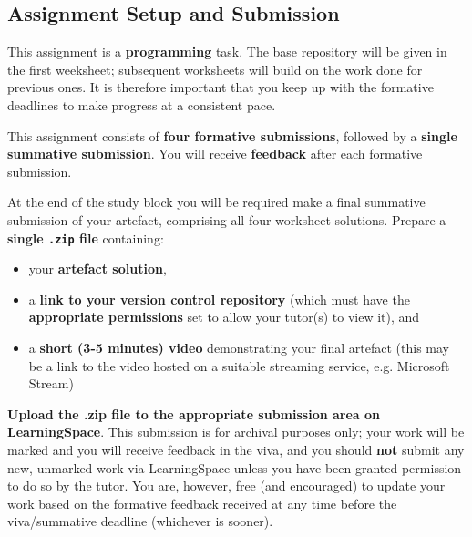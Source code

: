 \documentclass{../../fal_assignment}
\begin{document}
\subsection*{Assignment Setup and Submission}

This assignment is a \textbf{programming} task. The base repository will be given in the first weeksheet; subsequent worksheets will build on the work done for previous ones.
It is therefore important that you keep up with the formative deadlines to make progress at a consistent pace.

This assignment consists of \textbf{four formative submissions}, followed by a \textbf{single summative submission}.
You will receive \textbf{feedback} after each formative submission.

At the end of the study block you will be required make a final summative submission of your artefact, comprising all four worksheet solutions.
Prepare a \textbf{single \texttt{.zip} file} containing:
\begin{itemize}
	\item your \textbf{artefact solution},
	\item a \textbf{link to your version control repository} (which must have the \textbf{appropriate permissions} set to allow your tutor(s) to view it), and
	\item a \textbf{short (3-5 minutes) video} demonstrating your final artefact (this may be a link to the video hosted on a suitable streaming service, e.g. Microsoft Stream)
\end{itemize}
\textbf{Upload the .zip file to the appropriate submission area on LearningSpace}. 
This submission is for archival purposes only; your work will be marked and you will receive feedback in the viva, and you should \textbf{not} submit any new, unmarked work via LearningSpace unless you have been granted permission to do so by the tutor. You are, however, free (and encouraged) to update your work based on the formative feedback received at any time before the viva/summative deadline (whichever is sooner).

\paragraph{}
\end{document}
